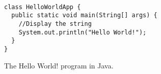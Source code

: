 \documentclass{article}
\begin{document}
\begin{program}
  \begin{verbatim}

class HelloWorldApp {
  public static void main(String[] args) {
    //Display the string
    System.out.println("Hello World!");
  }
}
\end{verbatim}
  \caption{The Hello World! program in Java.}
\end{program}
\end{document}
